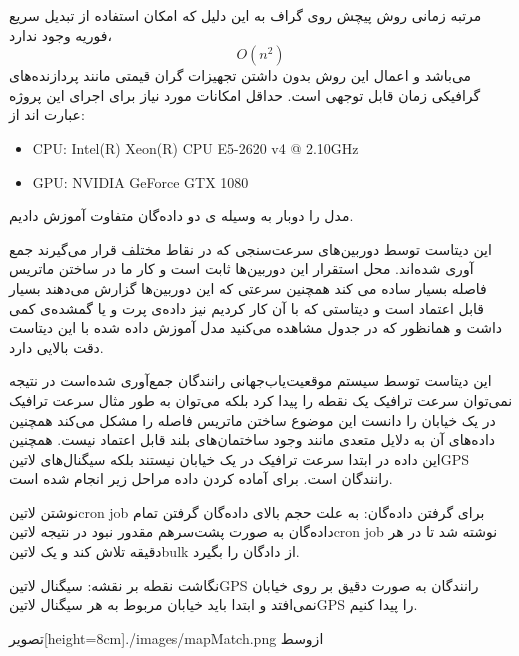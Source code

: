 مرتبه زمانی روش پیچش روی گراف به این دلیل که امکان استفاده از تبدیل سریع فوریه وجود ندارد،
\[
O(n^{2})
\]
می‌باشد و اعمال این روش بدون داشتن تجهیزات گران قیمتی مانند پردازنده‌های گرافیکی زمان قابل توجهی است. حداقل امکانات مورد نیاز برای اجرای این پروژه عبارت اند از:

\begin{latin}\begin{itemize}
\item CPU: Intel(R) Xeon(R) CPU E5-2620 v4 @ 2.10GHz
\item GPU: NVIDIA GeForce GTX 1080
\end{itemize}\end{latin}

مدل را دوبار به وسیله ی دو داده‌گان متفاوت آموزش دادیم.


این دیتاست توسط دوربین‌های سرعت‌سنجی که در نقاط مختلف قرار می‌گیرند جمع آوری شده‌اند. محل استقرار این دوربین‌ها ثابت است و کار ما در ساختن ماتریس فاصله بسیار ساده می کند همچنین سرعتی که این دوربین‌ها گزارش می‌دهند بسیار قابل اعتماد است و دیتاستی که با آن کار کردیم نیز داده‌ی پرت و یا گمشده‌ی کمی داشت و همانظور که در جدول  مشاهده می‌کنید مدل آموزش داده شده با این دیتاست دقت بالایی دارد.


این دیتاست توسط سیستم موقعیت‌‌یاب‌جهانی رانندگان جمع‌آوری شده‌است در نتیجه نمی‌توان سرعت ترافیک یک نقطه را پیدا کرد بلکه می‌توان
به طور مثال سرعت ترافیک در یک خیابان را دانست این موضوع ساختن ماتریس فاصله را مشکل می‌کند همچنین داده‌های آن به دلایل متعدی مانند
وجود ساختمان‌های بلند قابل اعتماد نیست. همچنین این داده در ابتدا سرعت ترافیک در یک خیابان نیستند بلکه سیگنال‌های ‌لاتین{GPS} رانندگان است. برای آماده کردن داده مراحل زیر انجام شده است.


 نوشتن ‌لاتین{cron job} برای گرفتن داده‌گان: به علت حجم بالای داده‌گان گرفتن تمام داده‌گان به صورت پشت‌سر‌هم مقدور نبود
در نتیجه ‌لاتین{cron job} نوشته شد تا در هر دقیقه تلاش کند و یک ‌لاتین{bulk} از دادگان را بگیرد.

 نگاشت نقطه بر نقشه: سیگنال ‌لاتین{GPS} رانندگان به صورت دقیق بر روی خیابان نمی‌افتد و ابتدا باید خیابان مربوط به هر سیگنال ‌لاتین{‌GPS} را پیدا کنیم.

  ‌تصویر[height=8cm]{./images/mapMatch.png}
  ‌ازوسط

